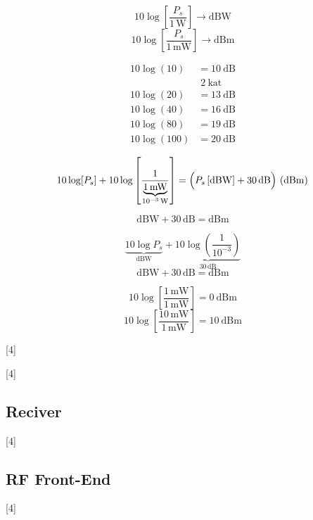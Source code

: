 \documentclass[11pt,a4paper]{article}
\begin{document}
\[ 10\log\left[\dfrac{P_s}{1\,\mathrm{W}}\right] \to \mathrm{dBW} \]
\[ 10\log\left[\dfrac{P_s}{1\,\mathrm{mW}}\right] \to \mathrm{dBm} \]

\begin{center}
\end{center}

\[
\begin{aligned}
10\log(10) &= 10\ \mathrm{dB}\\
&\;\scriptstyle 2\ \text{kat}\\[-2pt]
10\log(20) &= 13\ \mathrm{dB}\\
10\log(40) &= 16\ \mathrm{dB}\\
10\log(80) &= 19\ \mathrm{dB}\\
10\log(100) &= 20\ \mathrm{dB}
\end{aligned}
\]

\[ 10\log[P_s] + 10\log\left[\dfrac{1}{\underbrace{1\,\mathrm{mW}}_{10^{-3}\,\mathrm{W}}}\right] = \Bigl(P_s\,[\mathrm{dBW}] + 30\,\mathrm{dB}\Bigr)\ (\mathrm{dBm}) \]

\[ \mathrm{dBW} + 30\,\mathrm{dB} = \mathrm{dBm} \]

\[ \underbrace{10\log P_s}_{\mathrm{dBW}} + \underbrace{10\log\left(\dfrac{1}{10^{-3}}\right)}_{30\,\mathrm{dB}} \]
\[ \mathrm{dBW} + 30\,\mathrm{dB} = \mathrm{dBm} \]

\[ 10\log\left[\dfrac{1\,\mathrm{mW}}{1\,\mathrm{mW}}\right] = 0\ \mathrm{dBm} \]
\[ 10\log\left[\dfrac{10\,\mathrm{mW}}{1\,\mathrm{mW}}\right] = 10\ \mathrm{dBm} \]

[4]

[4]

\subsection*{Reciver}
[4]

\subsection*{RF Front-End}
[4]
\end{document}
